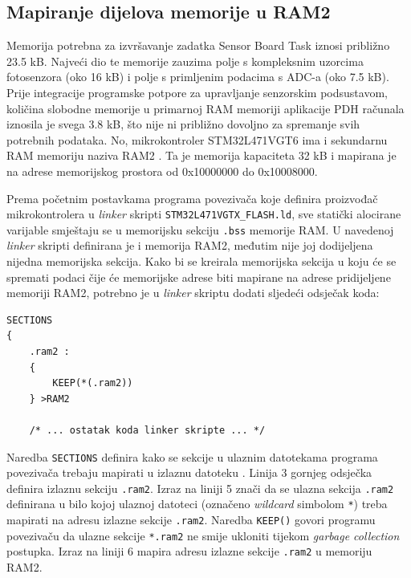 \subsection{Mapiranje dijelova memorije u RAM2}

Memorija potrebna za izvršavanje zadatka Sensor Board Task iznosi približno 23.5 kB. Najveći dio te memorije zauzima polje s kompleksnim uzorcima fotosenzora (oko 16 kB) i polje s primljenim podacima s ADC-a (oko 7.5 kB). Prije integracije programske potpore za upravljanje senzorskim podsustavom, količina slobodne memorije u primarnoj RAM memoriji aplikacije PDH računala iznosila je svega 3.8 kB, što nije ni približno dovoljno za spremanje svih potrebnih podataka. No, mikrokontroler STM32L471VGT6 ima i sekundarnu RAM memoriju naziva RAM2 \cite{stm32l4_manual}. Ta je memorija kapaciteta 32 kB i mapirana je na adrese memorijskog prostora od 0x10000000 do 0x10008000.

Prema početnim postavkama programa povezivača  koje definira proizvođač mikrokontrolera u \textit{linker} skripti \texttt{STM32L471VGTX\_FLASH.ld}, sve statički alocirane varijable smještaju se u memorijsku sekciju \texttt{.bss} memorije RAM. U navedenoj \textit{linker} skripti definirana je i memorija RAM2, međutim nije joj dodijeljena nijedna memorijska sekcija. Kako bi se kreirala memorijska sekcija u koju će se spremati podaci čije će memorijske adrese biti mapirane na adrese pridijeljene memoriji RAM2, potrebno je u \textit{linker} skriptu dodati sljedeći odsječak koda:

\begin{lstlisting}[caption={Smještanje memorijske sekcije \texttt{.ram2} u memoriju RAM2}]
SECTIONS
{
    .ram2 :
    {
        KEEP(*(.ram2))
    } >RAM2

    /* ... ostatak koda linker skripte ... */
\end{lstlisting}

Naredba \texttt{SECTIONS} definira kako se sekcije u ulaznim datotekama programa povezivača trebaju mapirati u izlaznu datoteku \cite{ld_dokumentacija}. Linija 3 gornjeg odsječka definira izlaznu sekciju \texttt{.ram2}. Izraz na liniji 5 znači da se ulazna sekcija \texttt{.ram2} definirana u bilo kojoj ulaznoj datoteci (označeno \textit{wildcard} simbolom \texttt{*}) treba mapirati na adresu izlazne sekcije \texttt{.ram2}. Naredba \texttt{KEEP()} govori programu povezivaču da ulazne sekcije \texttt{*.ram2} ne smije ukloniti tijekom \textit{garbage collection} postupka. Izraz na liniji 6 mapira adresu izlazne sekcije \texttt{.ram2} u memoriju RAM2.

